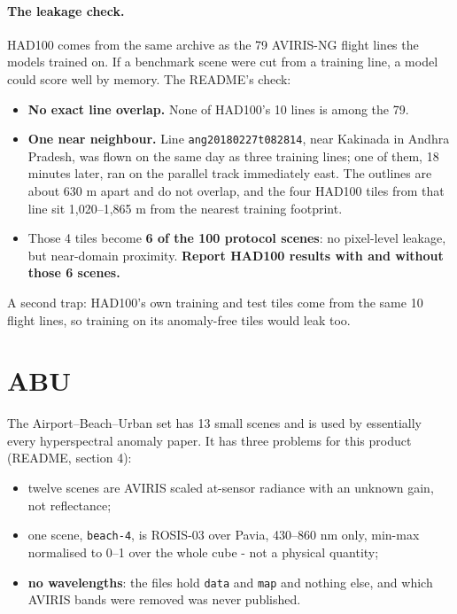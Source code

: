 \paragraph{The leakage check.} HAD100 comes from the same archive as the 79 AVIRIS-NG flight lines the models
trained on. If a benchmark scene were cut from a training line, a model could score well by memory. The README's
check\hfil{}\hfilneg{}:
\begin{itemize}
\item \textbf{No exact line overlap.} None of HAD100's 10 lines is among the 79.
\item \textbf{One near neighbour.} Line \texttt{ang20180227t082814}, near Kakinada in Andhra Pradesh, was flown on
the same day as three training lines; one of them, 18 minutes later, ran on the parallel track immediately east. The
outlines are about 630 m apart and do not overlap, and the four HAD100 tiles from that line sit 1,020--1,865 m from
the nearest training footprint.
\item Those 4 tiles become \textbf{6 of the 100 protocol scenes}: no pixel-level leakage, but near-domain proximity.
\textbf{Report HAD100 results with and without those 6 scenes.}
\end{itemize}
A second trap: HAD100's own training and test tiles come from the same 10 flight lines, so training on its anomaly-free
tiles would leak too.

\section{ABU}\label{sec:benchmarks:abu}

The Airport--Beach--Urban set \citep{kang2017hyperspectral} has 13 small scenes and is used by essentially every
hyperspectral anomaly paper. It has three problems for this product (README, section 4):
\begin{itemize}
\item twelve scenes are AVIRIS scaled at-sensor radiance with an unknown gain, not reflectance;
\item one scene, \texttt{beach-4}, is ROSIS-03 over Pavia, 430--860 nm only, min-max normalised to 0--1 over the whole
cube - not a physical quantity;
\item \textbf{no wavelengths}: the files hold \texttt{data} and \texttt{map} and nothing else, and which AVIRIS bands
were removed was never published.
\end{itemize}

